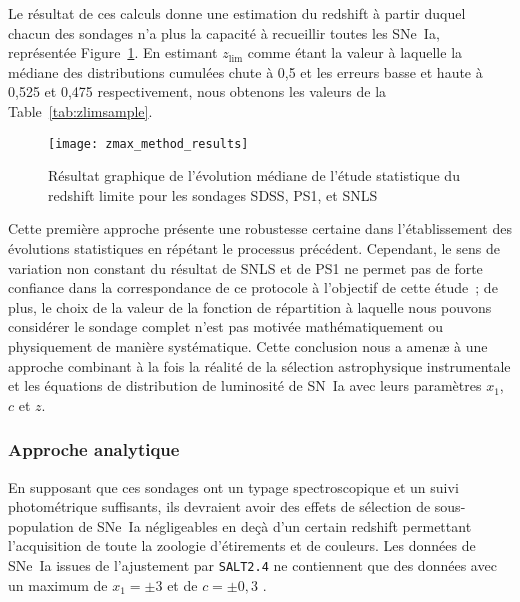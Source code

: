 \documentclass[../main/main.tex]{subfiles}
\begin{document}
Le résultat de ces calculs donne une estimation du redshift à partir duquel
chacun des sondages n'a plus la capacité à recueillir toutes les SNe~Ia,
représentée Figure~\ref{fig:zmax_method_results}. En estimant $z_{\lim}$ comme
étant la valeur à laquelle la médiane des distributions cumulées chute à 0,5 et
les erreurs basse et haute à 0,525 et 0,475 respectivement, nous obtenons les
valeurs de la Table~\ref{tab:zlimsample}.

\begin{figure}[ht]
    \centering
    \texttt{[image: zmax\_method\_results]}
    \captionsetup{justification=centering}
    \caption[Évolution médiane du redshift limite des sondages SDSS, PS1 et SNLS
    par approche statistique]{Résultat graphique de l'évolution médiane de
    l'étude statistique du redshift limite pour les sondages SDSS, PS1, et SNLS}
    \label{fig:zmax_method_results}
\end{figure}

Cette première approche présente une robustesse certaine dans l'établissement
des évolutions statistiques en répétant le processus précédent. Cependant, le
sens de variation non constant du résultat de SNLS et de PS1 ne permet pas
de forte confiance dans la correspondance de ce protocole à l'objectif de cette
étude~; de plus, le choix de la valeur de la fonction de répartition à laquelle
nous pouvons considérer le sondage complet n'est pas motivée mathématiquement ou
physiquement de manière systématique. Cette conclusion nous a amenæ à une
approche combinant à la fois la réalité de la sélection astrophysique
instrumentale et les équations de distribution de luminosité de SN~Ia avec leurs
paramètres $x_1$, $c$ et $z$.

\subsubsection{Approche analytique}\label{sssec:maglim}

En supposant que ces sondages ont un typage spectroscopique et un suivi
photométrique suffisants, ils devraient avoir des effets de sélection de
sous-population de SNe~Ia négligeables en deçà d'un certain redshift permettant
l'acquisition de toute la zoologie d'étirements et de couleurs. Les données de
SNe~Ia issues de l'ajustement par \texttt{SALT2.4} ne contiennent que des
données avec un maximum de $x_1 = \pm 3$ et de $c = \pm 0,3$ \citep[][cf
Section~\ref{ssec:salt}]{guy2007, betoule2014}.
\end{document}
